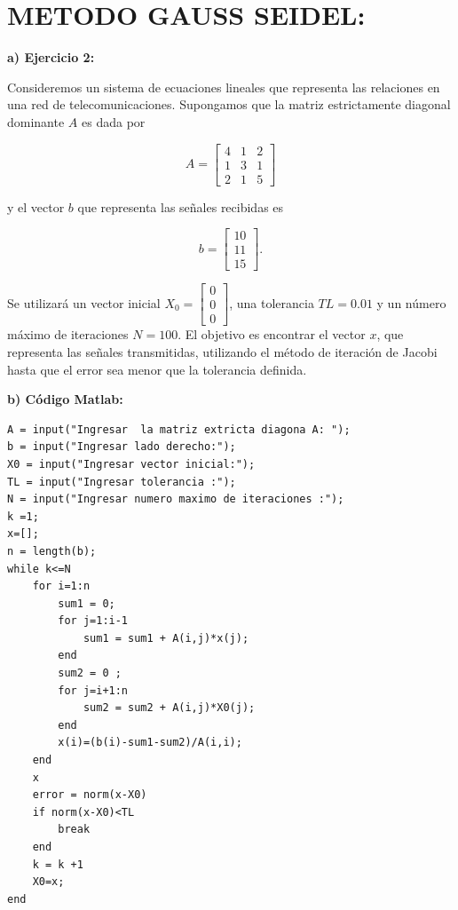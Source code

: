 \documentclass[12pt,a4paper,twoside]{article}  %
\begin{document}
\section{METODO GAUSS SEIDEL:}

\textbf{a) Ejercicio 2: }

Consideremos un sistema de ecuaciones lineales que representa las relaciones en una red de telecomunicaciones. Supongamos que la matriz estrictamente diagonal dominante \( A \) es dada por 

\[
A = \begin{bmatrix}
4 & 1 & 2 \\
1 & 3 & 1 \\
2 & 1 & 5
\end{bmatrix}
\]

y el vector \( b \) que representa las señales recibidas es 

\[
b = \begin{bmatrix}
10 \\
11 \\
15
\end{bmatrix}.
\]

Se utilizará un vector inicial \( X_0 = \begin{bmatrix} 0 \\ 0 \\ 0 \end{bmatrix} \), una tolerancia \( TL = 0.01 \) y un número máximo de iteraciones \( N = 100 \). El objetivo es encontrar el vector \( x \), que representa las señales transmitidas, utilizando el método de iteración de Jacobi hasta que el error sea menor que la tolerancia definida.


\textbf{b) Código Matlab:}

\begin{lstlisting}
A = input("Ingresar  la matriz extricta diagona A: ");
b = input("Ingresar lado derecho:");
X0 = input("Ingresar vector inicial:");
TL = input("Ingresar tolerancia :");
N = input("Ingresar numero maximo de iteraciones :");
k =1;
x=[];
n = length(b);
while k<=N
    for i=1:n
        sum1 = 0;
        for j=1:i-1
            sum1 = sum1 + A(i,j)*x(j);   
        end
        sum2 = 0 ;
        for j=i+1:n
            sum2 = sum2 + A(i,j)*X0(j);
        end
        x(i)=(b(i)-sum1-sum2)/A(i,i);
    end
    x
    error = norm(x-X0)
    if norm(x-X0)<TL
        break
    end
    k = k +1
    X0=x;     
end

\end{lstlisting}
\end{document}
